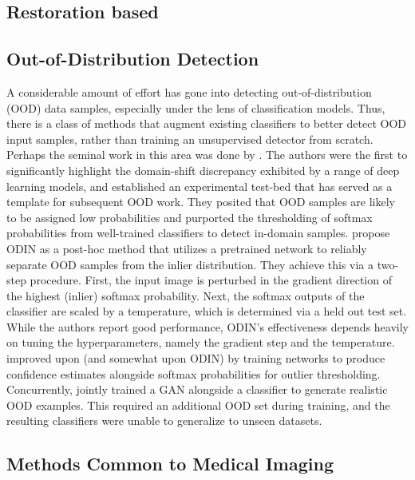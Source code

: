 \subsection{Restoration based}

\subsection{Out-of-Distribution Detection}
A considerable amount of effort has gone into detecting out-of-distribution (OOD) data samples, especially under the lens of classification models. Thus, there is a class of methods that augment existing classifiers to better detect OOD input samples, rather than training an unsupervised detector from scratch. Perhaps the seminal work in this area was done by \cite{Hendrycks2019}. The authors were the first to significantly highlight the domain-shift discrepancy exhibited by a range of deep learning models, and established an experimental test-bed that has served as a template for subsequent OOD work. They posited that OOD samples are likely to be assigned low probabilities and purported the thresholding of softmax probabilities from well-trained classifiers to detect in-domain samples. \cite{Liang2017} propose ODIN as a post-hoc method that utilizes a pretrained network to reliably separate OOD samples from the inlier distribution. They achieve this via a two-step procedure. First, the input image is perturbed in the gradient direction of the highest (inlier) softmax probability. Next, the softmax outputs of the classifier are scaled by a temperature, which is determined via a held out test set. While the authors report good performance, ODIN's effectiveness depends heavily on tuning the hyperparameters, namely the gradient step and the temperature. \cite{devries2018learning} improved upon \cite{Hendrycks2019} (and somewhat upon ODIN) by training networks to produce confidence estimates alongside softmax probabilities for outlier thresholding. Concurrently, \cite{Lee2018} jointly trained a GAN alongside a classifier to generate realistic OOD examples. This required an additional OOD set during training, and the resulting classifiers were unable to generalize to unseen datasets.


\subsection{Methods Common to Medical Imaging}
